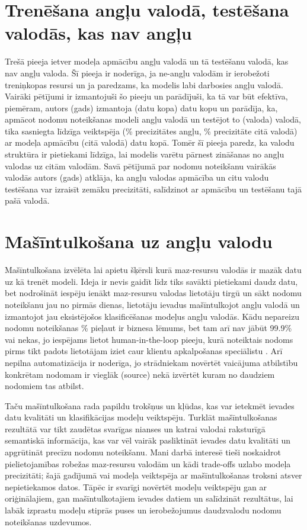 \section{Trenēšana angļu valodā, testēšana valodās, kas nav angļu}

Trešā pieeja ietver modeļa apmācību angļu valodā un tā testēšanu valodā, kas nav angļu valoda. Šī pieeja ir noderīga, ja ne-angļu valodām ir ierobežoti treniņkopas resursi un ja paredzams, ka modelis labi darbosies angļu valodā. Vairāki pētījumi ir izmantojuši šo pieeju un parādījuši, ka tā var būt efektīva, piemēram, autors (gads) izmantoja (datu kopa) datu kopu un parādīja, ka, apmācot nodomu noteikšanas modeli angļu valodā un testējot to (valoda) valodā, tika sasniegta līdzīga veiktspēja (\% precizitātes angļu, \% precizitāte citā valodā) ar modeļa apmācību (citā valodā) datu kopā. Tomēr šī pieeja paredz, ka valodu struktūra ir pietiekami līdzīga, lai modelis varētu pārnest zināšanas no angļu valodas uz citām valodām. Savā pētījumā par nodomu noteikšanu vairākās valodās autors (gads) atklāja, ka angļu valodas apmācība un citu valodu testēšana var izraisīt zemāku precizitāti, salīdzinot ar apmācību un testēšanu tajā pašā valodā.


\section{Mašīntulkošana uz angļu valodu}

Mašīntulkošana izvēlēta lai apietu šķērsli kurā maz-resursu valodās ir mazāk datu uz kā trenēt modeli. Ideja ir nevis gaidīt līdz tiks savākti pietiekami daudz datu, bet nodrošināt iespēju ienākt maz-resursu valodas lietotāju tirgū un sākt nodomu noteikšanu jau no pirmās dienas, lietotāju ievadus mašīntulkojot angļu valodā un izmantojot jau eksistējošos klasificēšanas modeļus angļu valodās. Kādu nepareizu nodomu noteikšanas \% pieļaut ir biznesa lēmums, bet tam arī nav jābūt 99.9\% vai nekas, jo iespējams lietot human-in-the-loop pieeju, kurā noteiktais nodoms pirms tikt padots lietotājam iziet caur klientu apkalpošanas speciālistu \cite{paikens2020}. Arī nepilna automatizācija ir noderīga, jo strādniekam novērtēt vaicājuma atbilstību konkrētam nodomam ir vieglāk (source) nekā izvērtēt kuram no daudziem nodomiem tas atbilst.

Taču mašīntulkošana rada papildu trokšņus un kļūdas, kas var ietekmēt ievades datu kvalitāti un klasifikācijas modeļu veiktspēju. Turklāt mašīntulkošanas rezultātā var tikt zaudētas svarīgas nianses un katrai valodai raksturīgā semantiskā informācija, kas var vēl vairāk pasliktināt ievades datu kvalitāti un apgrūtināt precīzu nodomu noteikšanu. Mani darbā interesē tieši noskaidrot pielietojamības robežas maz-resursu valodām un kādi trade-offs uzlabo modeļa precizitāti; šajā gadījumā vai modeļa veiktspēja ar mašīntulkošanas troksni atsver nepietiekamos datos. Tāpēc ir svarīgi novērtēt modeļu veiktspēju gan ar oriģinālajiem, gan mašīntulkotajiem ievades datiem un salīdzināt rezultātus, lai labāk izprastu modeļu stiprās puses un ierobežojumus daudzvalodu nodomu noteikšanas uzdevumos.